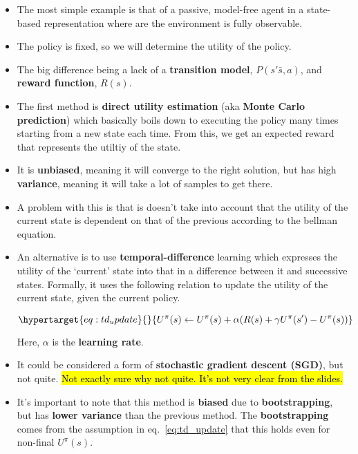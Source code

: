 \documentclass[
]{book}
\begin{document}
\begin{itemize}
\item
  The most simple example is that of a passive, model-free agent in a
  state-based representation where are the environment is fully
  observable.
\item
  The policy is fixed, so we will determine the utility of the policy.
\item
  The big difference being a lack of a \textbf{transition model},
  \(P(s' \bar s,a)\), and \textbf{reward function}, \(R(s)\).
\item
  The first method is \textbf{direct utility estimation} (aka
  \textbf{Monte Carlo prediction}) which basically boils down to
  executing the policy many times starting from a new state each time.
  From this, we get an expected reward that represents the utiltiy of
  the state.
\item
  It is \textbf{unbiased}, meaning it will converge to the right
  solution, but has high \textbf{variance}, meaning it will take a lot
  of samples to get there.
\item
  A problem with this is that is doesn't take into account that the
  utility of the current state is dependent on that of the previous
  according to the bellman equation.
\item
  An alternative is to use \textbf{temporal-difference} learning which
  expresses the utility of the `current' state into that in a difference
  between it and successive states. Formally, it uses the following
  relation to update the utility of the current state, given the current
  policy.

  \begin{equation}\protect\hypertarget{eq:td_update}{}{
  U^\pi(s) \leftarrow U^\pi(s) + \alpha(R(s) + \gamma U^\pi(s') - U^\pi(s))
  }\label{eq:td_update}\end{equation}

  Here, \(\alpha\) is the \textbf{learning rate}.
\item
  It could be considered a form of \textbf{stochastic gradient descent
  (SGD)}, but not quite. \hl{Not exactly sure why not quite. It's not
  very clear from the slides.}
\item
  It's important to note that this method is \textbf{biased} due to
  \textbf{bootstrapping}, but has \textbf{lower variance} than the
  previous method. The \textbf{bootstrapping} comes from the assumption
  in eq.~\ref{eq:td_update} that this holds even for non-final
  \(U^\pi(s)\).
\end{itemize}
\end{document}
